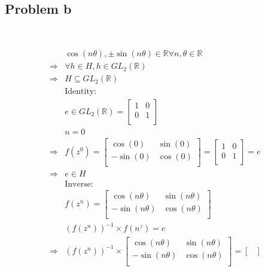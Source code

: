 \documentclass{article}
\begin{document}
~

\subsection*{Problem b}

~

\begin{equation*}
    \begin{split}
        &\cos(n\theta),\pm \sin(n\theta)\in\mathbb{R}\forall n,\theta\in\mathbb{R} \\
        \Rightarrow&\forall h\in H, h\in GL_2(\mathbb{R} )\\
        \Rightarrow&H\subseteq GL_2(\mathbb{R} )\\
        &\text{Identity}:\\
        &e\in GL_2(\mathbb{R} )=\begin{bmatrix}
            1&0\\
            0&1\\
        \end{bmatrix}\\
        &n=0\\
        \Rightarrow&f(z^0)=\begin{bmatrix}
            \cos(0)&\sin(0)\\
            -\sin(0)&\cos(0)\\
        \end{bmatrix}=\begin{bmatrix}
            1&0\\
            0&1\\
        \end{bmatrix}=e\\
        \Rightarrow&e\in H\\
        &\text{Inverse}:\\
        &f(z^n)=\begin{bmatrix}
            \cos(n\theta)&\sin(n\theta)\\
            -\sin(n\theta)&\cos(n\theta)\\
        \end{bmatrix}\\
        &(f(z^n))^{-1}\times f(n^z)=e\\
        \Rightarrow&(f(z^n))^{-1}\times\begin{bmatrix}
            \cos(n\theta)&\sin(n\theta)\\
            -\sin(n\theta)&\cos(n\theta)\\
        \end{bmatrix}=\begin{bmatrix}

\end{bmatrix}
\end{split}
\end{equation*}
\end{document}
